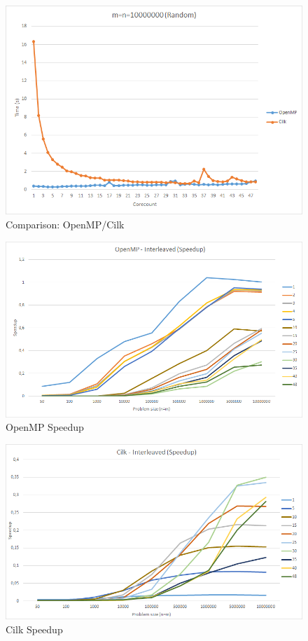 \documentclass[12pt,a4paper,titlepage,oneside]{scrartcl}
\begin{document}
\begin{figure}[h]
\includegraphics[width=\linewidth]{Saturn_Random_10000000}
\caption{Comparison: OpenMP/Cilk}
\end{figure}

\begin{figure}[h]
\includegraphics[width=\linewidth]{Saturn_OpenMP_Speedup}
\caption{OpenMP Speedup}
\end{figure}

\begin{figure}[h]
\includegraphics[width=\linewidth]{Saturn_Cilk_Speedup}
\caption{Cilk Speedup}
\end{figure}
\end{document}
